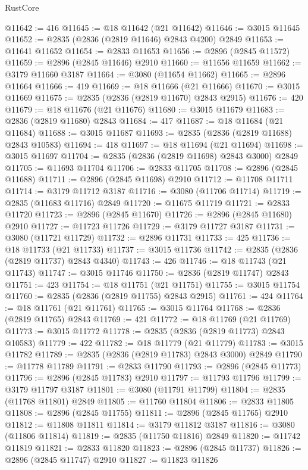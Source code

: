\begin{lexlean}{RustCore}
\begin{coremodule}
@11642 := 416
@11645 := @18 @11642 (@21 @11642)
@11646 := @3015 @11645
@11652 := @2835 (@2836 (@2819 @11646) @2843 @4200) @2849
@11653 := @11641 @11652
@11654 := @2833 @11653
@11656 := @2896 (@2845 @11572)
@11659 := @2896 (@2845 @11646) @2910
@11660 := @11656 @11659
@11662 := @3179 @11660 @3187
@11664 := @3080 (@11654 @11662)
@11665 := @2896 @11664
@11666 := 419
@11669 := @18 @11666 (@21 @11666)
@11670 := @3015 @11669
@11675 := @2835 (@2836 (@2819 @11670) @2843 @2915)
@11676 := 420
@11679 := @18 @11676 (@21 @11676)
@11680 := @3015 @11679
@11683 := @2836 (@2819 @11680) @2843
@11684 := 417
@11687 := @18 @11684 (@21 @11684)
@11688 := @3015 @11687
@11693 := @2835 (@2836 (@2819 @11688) @2843 @10583)
@11694 := 418
@11697 := @18 @11694 (@21 @11694)
@11698 := @3015 @11697
@11704 := @2835 (@2836 (@2819 @11698) @2843 @3000) @2849
@11705 := @11693 @11704
@11706 := @2833 @11705
@11708 := @2896 (@2845 @11688)
@11711 := @2896 (@2845 @11698) @2910
@11712 := @11708 @11711
@11714 := @3179 @11712 @3187
@11716 := @3080 (@11706 @11714)
@11719 := @2835 (@11683 @11716) @2849
@11720 := @11675 @11719
@11721 := @2833 @11720
@11723 := @2896 (@2845 @11670)
@11726 := @2896 (@2845 @11680) @2910
@11727 := @11723 @11726
@11729 := @3179 @11727 @3187
@11731 := @3080 (@11721 @11729)
@11732 := @2896 @11731
@11733 := 425
@11736 := @18 @11733 (@21 @11733)
@11737 := @3015 @11736
@11742 := @2835 (@2836 (@2819 @11737) @2843 @4340)
@11743 := 426
@11746 := @18 @11743 (@21 @11743)
@11747 := @3015 @11746
@11750 := @2836 (@2819 @11747) @2843
@11751 := 423
@11754 := @18 @11751 (@21 @11751)
@11755 := @3015 @11754
@11760 := @2835 (@2836 (@2819 @11755) @2843 @2915)
@11761 := 424
@11764 := @18 @11761 (@21 @11761)
@11765 := @3015 @11764
@11768 := @2836 (@2819 @11765) @2843
@11769 := 421
@11772 := @18 @11769 (@21 @11769)
@11773 := @3015 @11772
@11778 := @2835 (@2836 (@2819 @11773) @2843 @10583)
@11779 := 422
@11782 := @18 @11779 (@21 @11779)
@11783 := @3015 @11782
@11789 := @2835 (@2836 (@2819 @11783) @2843 @3000) @2849
@11790 := @11778 @11789
@11791 := @2833 @11790
@11793 := @2896 (@2845 @11773)
@11796 := @2896 (@2845 @11783) @2910
@11797 := @11793 @11796
@11799 := @3179 @11797 @3187
@11801 := @3080 (@11791 @11799)
@11804 := @2835 (@11768 @11801) @2849
@11805 := @11760 @11804
@11806 := @2833 @11805
@11808 := @2896 (@2845 @11755)
@11811 := @2896 (@2845 @11765) @2910
@11812 := @11808 @11811
@11814 := @3179 @11812 @3187
@11816 := @3080 (@11806 @11814)
@11819 := @2835 (@11750 @11816) @2849
@11820 := @11742 @11819
@11821 := @2833 @11820
@11823 := @2896 (@2845 @11737)
@11826 := @2896 (@2845 @11747) @2910
@11827 := @11823 @11826

\end{coremodule}
\end{lexlean}
